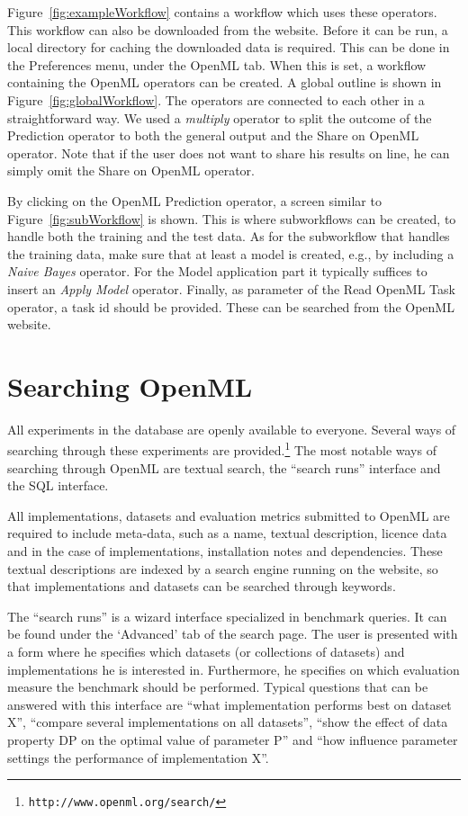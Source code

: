 \documentclass[10pt, twoside]{article}
\begin{document}
Figure~\ref{fig:exampleWorkflow} contains a workflow which uses these operators. This workflow can also be downloaded from the website. Before it can be run, a local directory for caching the downloaded data is required. This can be done in the Preferences menu, under the OpenML tab. When this is set, a workflow containing the OpenML operators can be created. A global outline is shown in Figure~\ref{fig:globalWorkflow}. The operators are connected to each other in a straightforward way. We used a \emph{multiply} operator to split the outcome of the Prediction operator to both the general output and the Share on OpenML operator. Note that if the user does not want to share his results on line, he can simply omit the Share on OpenML operator. 

By clicking on the OpenML Prediction operator, a screen similar to Figure~\ref{fig:subWorkflow} is shown. This is where subworkflows can be created, to handle both the training and the test data. As for the subworkflow that handles the training data, make sure that at least a model is created, e.g., by including a \emph{Naive Bayes} operator. For the Model application part it typically suffices to insert an \emph{Apply Model} operator. 
Finally, as parameter of the Read OpenML Task operator, a task id should be provided. These can be searched from the OpenML website. 

\section{Searching OpenML}
\label{sec:Searching}
All experiments in the database are openly available to everyone. Several ways of searching through these experiments are provided.\footnote{\texttt{http://www.openml.org/search/}} The most notable ways of searching through OpenML are textual search, the ``search runs'' interface and the SQL interface.

All implementations, datasets and evaluation metrics submitted to OpenML are required to include meta-data, such as a name, textual description, licence data and in the case of implementations, installation notes and dependencies. These textual descriptions are indexed by a search engine running on the website, so that implementations and datasets can be searched through keywords. 

The ``search runs'' is a wizard interface specialized in benchmark queries. It can be found under the `Advanced' tab of the search page. The user is presented with a form where he specifies which datasets (or collections of datasets) and implementations he is interested in. Furthermore, he specifies on which evaluation measure the benchmark should be performed. Typical questions that can be answered with this interface are ``what implementation performs best on dataset X'', ``compare several implementations on all datasets'', ``show the effect of data property DP on the optimal value of parameter P'' and ``how influence parameter settings the performance of implementation X''.
\end{document}
